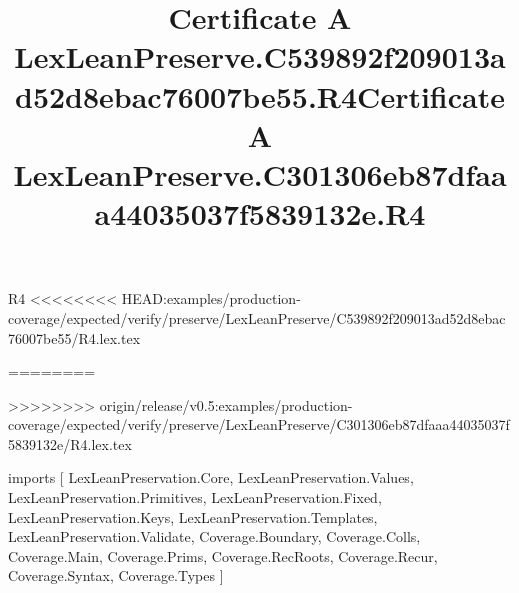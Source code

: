 \begin{lexlean}{R4}
<<<<<<<< HEAD:examples/production-coverage/expected/verify/preserve/LexLeanPreserve/C539892f209013ad52d8ebac76007be55/R4.lex.tex
\title{Certificate A LexLeanPreserve.C539892f209013ad52d8ebac76007be55.R4}
========
\title{Certificate A LexLeanPreserve.C301306eb87dfaaa44035037f5839132e.R4}
>>>>>>>> origin/release/v0.5:examples/production-coverage/expected/verify/preserve/LexLeanPreserve/C301306eb87dfaaa44035037f5839132e/R4.lex.tex
\begin{coremodule}
imports [
  LexLeanPreservation.Core,
  LexLeanPreservation.Values,
  LexLeanPreservation.Primitives,
  LexLeanPreservation.Fixed,
  LexLeanPreservation.Keys,
  LexLeanPreservation.Templates,
  LexLeanPreservation.Validate,
  Coverage.Boundary,
  Coverage.Colls,
  Coverage.Main,
  Coverage.Prims,
  Coverage.RecRoots,
  Coverage.Recur,
  Coverage.Syntax,
  Coverage.Types
]


\end{coremodule}
\end{lexlean}
